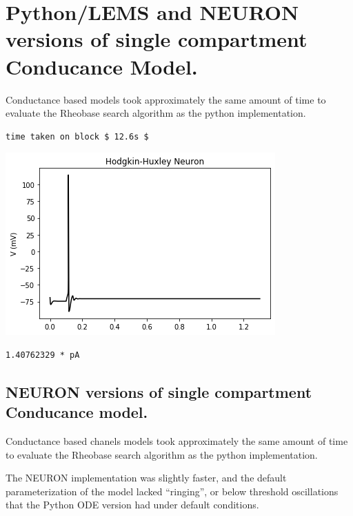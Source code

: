 \section{Python/LEMS and NEURON versions of single compartment Conducance Model.}

Conductance based models took approximately the same amount of
time to evaluate the Rheobase search algorithm as the python
implementation.


\begin{verbatim}
time taken on block $ 12.6s $
\end{verbatim}

\begin{center}
\includegraphics{backend_check_files/backend_check_22_2.png}
\end{center}

\begin{verbatim}
1.40762329 * pA
\end{verbatim}


\subsection{NEURON versions of single compartment Conducance
model.}

Conductance based chanels models took approximately the same amount of time to evaluate the Rheobase search algorithm as the python
implementation.

The NEURON implementation was slightly faster, and the default
parameterization of the model lacked ``ringing'', or below threshold
oscillations that the Python ODE version had under default conditions.

